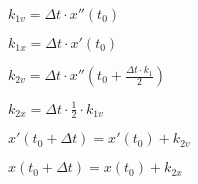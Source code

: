 
$
k_{1v} = \Delta t \cdot x''( t_{0} )
$

$
k_{1x} = \Delta t \cdot x' ( t_{0} )
$

$
k_{2v} = \Delta t \cdot
x''( t_{0} + \frac {\Delta t \cdot k_{1} } {2} )
$

$
k_{2x} = \Delta t \cdot \frac {1} {2} \cdot k_{1v}
$

$
x'( t_{0} + \Delta t ) = x'( t_{0} ) + k_{2v}
$

$
x( t_{0} + \Delta t ) = x( t_{0} ) + k_{2x}
$

